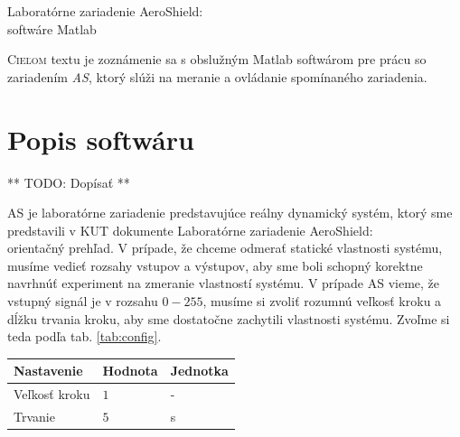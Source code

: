 \documentclass[a4paper, 10pt, ]{article}
\begin{document}
\begin{flushleft}
    Laboratórne zariadenie AeroShield:\\ softwáre Matlab
\end{flushleft}

\bigskip

\normalsize
\normalfont

\lstset{style=mystyle}










\noindent
\lettrine[lines=1, nindent=1pt, loversize=0.0]{C}{ieľom}
textu je zoznámenie sa s obslužným Matlab softwárom pre prácu so zariadením \emph{AS}, ktorý slúži na meranie a ovládanie spomínaného zariadenia.


\section{Popis softwáru}
** TODO: Dopísať **

AS je laboratórne zariadenie predstavujúce reálny dynamický systém, ktorý sme predstavili v KUT dokumente Laboratórne zariadenie AeroShield:\\ orientačný prehľad. V prípade, že chceme odmerať statické vlastnosti systému, musíme vedieť rozsahy vstupov a výstupov, aby sme boli schopný korektne navrhnúť experiment na zmeranie vlastností systému.
V prípade AS vieme, že vstupný signál je v rozsahu $0 - 255$, musíme si zvoliť rozumnú veľkosť kroku a dĺžku trvania kroku, aby sme dostatočne zachytili vlastnosti systému. Zvoľme si teda podľa tab. \ref{tab:config}.

\begin{center}

    \vspace{-10pt}

    \label{tab:config}

    \lstyle

    \begin{tabular*}{\textwidth}{@{ \extracolsep{\fill}} lll}
        \toprule
        Nastavenie & Hodnota & Jednotka \\
        \midrule
        Veľkosť kroku & $1$ & - \\
        Trvanie & $5$ & s \\
        \bottomrule
    \end{tabular*}

\end{center}
\end{document}
